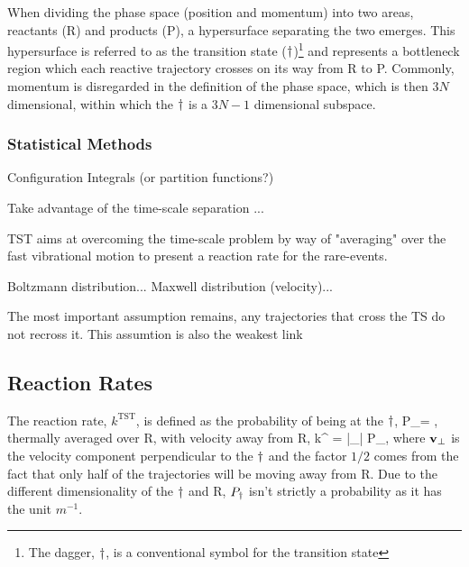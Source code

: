 
When dividing the phase space (position and momentum) into two areas, reactants (R) and products (P), a hypersurface separating the two emerges.
This hypersurface is referred to as the transition state ($\dagger$)\footnote{The dagger, $\dagger$, is a conventional symbol for the transition state} and represents a bottleneck region which each reactive trajectory crosses on its way from R to P.
Commonly, momentum is disregarded in the definition of the phase space, which is then  $3N$ dimensional, within which the $\dagger$ is a $3N-1$ dimensional subspace.

\subsubsection{Statistical Methods}

\bit
\item Configuration Integrals (or partition functions?)
\eit

Take advantage of the time-scale separation ...

TST aims at overcoming the time-scale problem by way of "averaging" over the fast vibrational motion to present a reaction rate for the rare-events.

Boltzmann distribution...
Maxwell distribution (velocity)...


\incomplete

The most important assumption remains, any trajectories that cross the TS do not recross it.
This assumtion is also the weakest link \expand

\subsection{Reaction Rates}
The reaction rate, $k^\text{TST}$, is defined as the probability of being at the $\dagger$,
P_\ts = ,
\eeq
thermally averaged over R, with velocity away from R,\citemiss
{}
k^ = |_\perp| P_\ts,
\eeq
where ${\mathrm{\mathbf{\bm{v}}}}_\perp$ is the velocity component perpendicular to the $\dagger$ and the factor $1/2$ comes from the fact that only half of the trajectories will be moving away from R.
Due to the different dimensionality of the $\dagger$ and R, $P_\dagger$ isn't strictly a probability as it has the unit $\unit{m^{-1}}$. \expand


